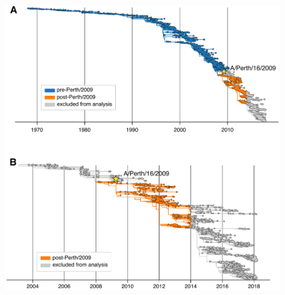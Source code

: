 \documentclass[9pt,twocolumn,twoside]{pnas-new}
\begin{document}
\begin{suppfigure}[H]
\centerline{\includegraphics[width=0.9\textwidth]{figs/supp_H3N2_phylogeny/H3N2_phylogeny.pdf}}
\caption{\label{suppfig:tree}
{\bf A phylogenetic tree of all HA sequences used in our analysis of mutation frequencies.}
(A) HA sequences were sampled at a rate of six viruses per month from January 1, 1968 through February 1, 2018.
The Perth/2009 strain used in our experiments is indicated.
The rest of the tree is partitioned into nodes that preceded the split of the Perth/2009 strain from the trunk of the tree (blue) and nodes that branched off the trunk after the clade containing Perth/2009 (orange).
In Figure~\ref{fig:muteffect_maxfreq}, these two partitions of the tree are analyzed separately.
Nodes in the clade containing the Perth/2009 strain and nodes sampled in 2014 or after were excluded from our analyses.
The Perth/2009 strain was excluded to avoid artifacts related to mutations that occurred on the branches leading to the HA sequence used in the experiment.
The post-2014 nodes were excluded because the evolutionary fates of many sequences after this date are not yet full resolved.
(B) The post-Perth/2009 partition of the tree containing only sequences from unpassaged isolates.
}
\end{suppfigure}
\end{document}
